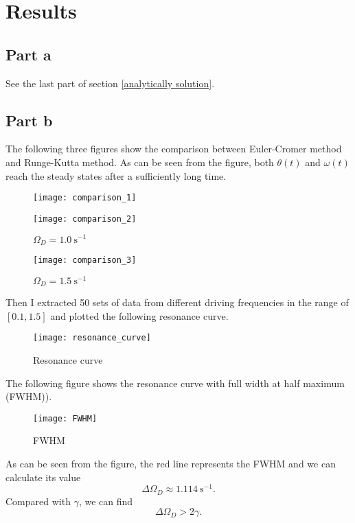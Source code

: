 \documentclass[a4paper]{article}
\begin{document}
 	\section{Results}
 	\subsection{Part a}
 	See the last part of section \ref{analytically solution}.
 	\subsection{Part b}\label{partb}
 	The following three figures show the comparison between Euler-Cromer method and Runge-Kutta method. As can be seen from the figure, both $\theta(t)$ and $\omega(t)$ reach the steady states after a sufficiently long time.
 	\begin{figure}[H]
		\centering
		\texttt{[image: comparison\_1]}
		\caption{$\Omega_D = 0.5 \mathrm{~s^{-1}}$}
		\label{a}
		\texttt{[image: comparison\_2]}
		\caption{$\Omega_D = 1.0 \mathrm{~s^{-1}}$}
		\label{b}
	\end{figure}
	\newpage
	 \begin{figure}[H]
		\centering
		\texttt{[image: comparison\_3]}
		\caption{$\Omega_D = 1.5 \mathrm{~s^{-1}}$}
		\label{c}
	\end{figure}
	
	Then I extracted 50 sets of data from different driving frequencies in the range of $[0.1, 1.5]$ and plotted the following resonance curve.
	 \begin{figure}[H]
		\centering
		\texttt{[image: resonance\_curve]}
		\caption{Resonance curve}
		\label{res}
	\end{figure}
	
	The following figure shows the resonance curve with full width at half maximum (FWHM)).
	\begin{figure}[H]
		\centering
		\texttt{[image: FWHM]}
		\caption{FWHM}
		\label{FWHM}
	\end{figure}
	As can be seen from the figure, the red line represents the FWHM and we can calculate its value
	\begin{equation}
		\Delta\Omega _D \approx 1.114 \mathrm{~s^{-1}}.
	\end{equation}
	Compared with $\gamma$, we can find
	\begin{equation}
		\Delta\Omega _D > 2\gamma.
	\end{equation}
\end{document}

